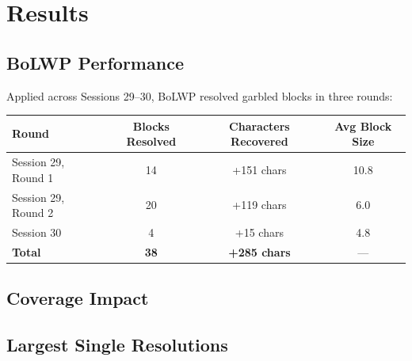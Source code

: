 \documentclass[11pt,a4paper]{article}
\begin{document}
\section{Results}

\subsection{BoLWP Performance}

Applied across Sessions 29--30, BoLWP resolved garbled blocks in three rounds:

\begin{table}[h]
\centering
\begin{tabular}{lccc}
\toprule
\textbf{Round} & \textbf{Blocks Resolved} & \textbf{Characters Recovered} & \textbf{Avg Block Size} \\
\midrule
Session 29, Round 1 & 14 & +151 chars & 10.8 \\
Session 29, Round 2 & 20 & +119 chars & 6.0 \\
Session 30 & 4 & +15 chars & 4.8 \\
\midrule
\textbf{Total} & \textbf{38} & \textbf{+285 chars} & --- \\
\bottomrule
\end{tabular}
\end{table}

\subsection{Coverage Impact}

\begin{table}[h]
\centering
{}
\end{table}

\subsection{Largest Single Resolutions}
\end{document}
